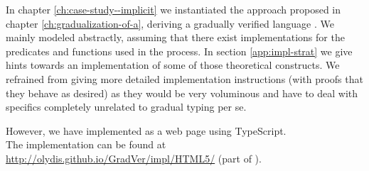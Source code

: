 In chapter \ref{ch:case-study--implicit} we instantiated the approach proposed in chapter \ref{ch:gradualization-of-a}, deriving a gradually verified language \gvlidf.
We mainly modeled \gvlidf abstractly, assuming that there exist implementations for the predicates and functions used in the process.
In section \ref{app:impl-strat} we give hints towards an implementation of some of those theoretical constructs.
We refrained from giving more detailed implementation instructions (with proofs that they behave as desired) as they would be very voluminous and have to deal with specifics completely unrelated to gradual typing per se.

However, we have implemented \gvlidf as a web page using TypeScript.\\
The implementation can be found at \url{http://olydis.github.io/GradVer/impl/HTML5/} (part of \cite{olydisGitHub}).